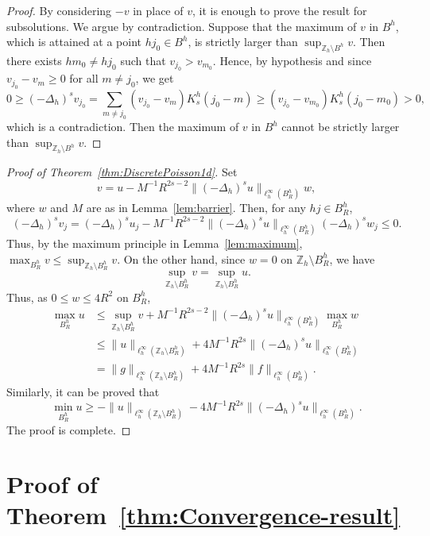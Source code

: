 \documentclass[a4paper,11pt,reqno]{amsart}
\newcommand{\Z}{\mathbb{Z}}
\theoremstyle{definition}
\numberwithin{equation}{section}
\begin{document}
\begin{proof}
By considering $-v$ in place of $v$, it is enough to prove the result for subsolutions. We argue by contradiction.
Suppose that the maximum of $v$ in $B^h$, which is attained at a point $hj_0\in B^h$, is strictly larger than
$\sup_{\Z_h\setminus B^h}v$. Then there exists $hm_0\neq hj_0$ such that $v_{j_0}>v_{m_0}$. Hence,
by hypothesis and since $v_{j_0}-v_m\geq0$ for all $m\neq j_0$, we get
$$
0\geq(-\Delta_h)^sv_{j_0}=\sum_{m\neq j_0}(v_{j_0}-v_m)K^h_s(j_0-m)
\geq(v_{j_0}-v_{m_0})K^h_s(j_0-m_0)>0,
$$
which is a contradiction.
Then the maximum of $v$ in $B^h$ cannot be strictly larger than $\sup_{\Z_h\setminus B^h}v$.
\end{proof}

\begin{proof}[Proof of Theorem~\ref{thm:DiscretePoisson1d}]
Set
$$
v=u-M^{-1}R^{2s-2} \|(-\Delta_h)^su\|_{\ell_h^{\infty}(B_R^h)}w,
$$
where $w$ and $M$ are as in Lemma~\ref{lem:barrier}. Then, for any $hj\in B_R^h$,
\[
(-\Delta_h)^sv_{j}=(-\Delta_h)^su_{j}
-M^{-1}R^{2s-2}\|(-\Delta_h)^su\|_{\ell_h^{\infty}(B_R^h)}(-\Delta_h)^sw_j\le 0.
\]
Thus, by the maximum principle in Lemma~\ref{lem:maximum},
$\max_{B_R^h}v\le \sup_{\Z_h\setminus B_R^h}v$. On the other hand, since $w=0$ on $\Z_h\setminus B_R^h$, we have
\[
\sup_{\Z_h\setminus B_R^h}v= \sup_{\Z_h\setminus B_R^h}u.
\]
Thus, as $0\leq w\le 4R^2$ on $B_R^h$,
\begin{align*}
\max_{B_R^h}u &\le \sup_{\Z_h\setminus B_R^h}v
+ M^{-1}R^{2s-2}\|(-\Delta_h)^su\|_{\ell_h^{\infty}(B_R^h)} \max_{B_R^h}w \\
&\le \|u\|_{\ell_h^{\infty}(\Z_h\setminus B_R^h)}
+ 4M^{-1}R^{2s}\|(-\Delta_h)^su\|_{\ell_h^{\infty}(B_R^h)}\\
&=\|g\|_{\ell_h^\infty(\Z_h\setminus B_R^h)}+4M^{-1} R^{2s}
\|f\|_{\ell_h^\infty(B_R^h)}.
\end{align*}
Similarly, it can be proved that
$$
\min_{B_R^h}u \ge -\|u\|_{\ell_h^{\infty}(\Z_h\setminus B_R^h)}
- 4M^{-1}R^{2s}\|(-\Delta_h)^su\|_{\ell_h^{\infty} (B_R^h)}.
$$
The proof is complete.
\end{proof}

\section{Proof of Theorem~\ref{thm:Convergence-result}}
\label{sec:proofmain}
\end{document}
